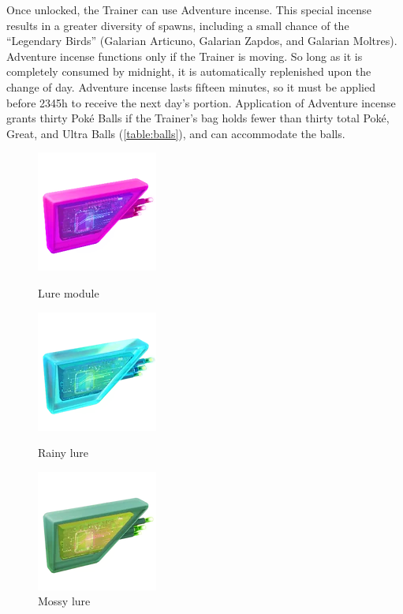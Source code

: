 Once unlocked, the Trainer can use Adventure incense.
This special incense results in a greater diversity of spawns, including
  a small chance of the ``Legendary Birds''
  (Galarian Articuno, Galarian Zapdos, and Galarian Moltres).
Adventure incense functions only if the Trainer is moving.
So long as it is completely consumed by midnight, it is automatically replenished
  upon the change of day.
Adventure incense lasts fifteen minutes, so it must be applied before 2345h
  to receive the next day's portion.
Application of Adventure incense grants thirty Poké Balls if the Trainer's
  bag holds fewer than thirty total Poké, Great, and Ultra Balls (\autoref{table:balls}),
  and can accommodate the balls.
\begin{figure}[h!]
  \begin{minipage}[t]{0.3\textwidth}
    \begin{center}
    \includegraphics[scale=.4]{images/lure.png}
    \end{center}
    \caption*{Lure module}
    \label{fig:lure}
  \end{minipage}
  \begin{minipage}[t]{0.3\textwidth}
    \begin{center}
    \includegraphics[scale=.4]{images/rainylure.png}
    \end{center}
    \caption*{Rainy lure}
    \label{fig:rainylure}
  \end{minipage}
  \begin{minipage}[t]{0.3\textwidth}
    \begin{center}
    \includegraphics[scale=.4]{images/mossylure.png}
    \end{center}
    \caption*{Mossy lure}
    \label{fig:mossylure}
  \end{minipage}
\end{figure}

